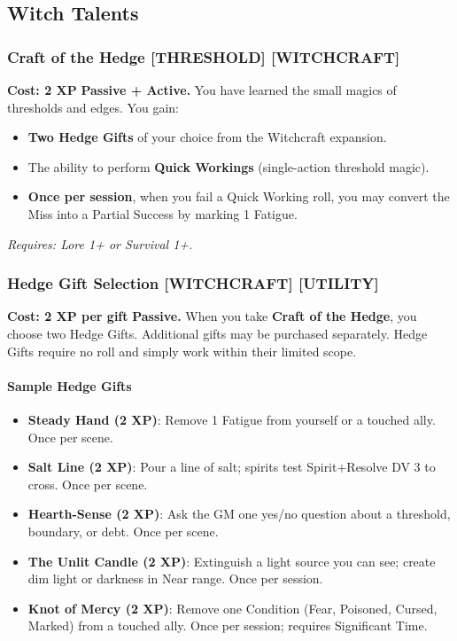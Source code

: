 \documentclass[12pt,a4paper]{book}
\begin{document}
\subsection*{Witch Talents}
\label{sec:minor-witch}

\subsubsection*{Craft of the Hedge \textnormal{[THRESHOLD] [WITCHCRAFT]}}
\label{talent:craft-of-the-hedge}
\textbf{Cost: 2 XP} \textbf{Passive + Active.} You have learned the small magics of thresholds and edges. You gain:
\begin{itemize}
\item \textbf{Two Hedge Gifts} of your choice from the Witchcraft expansion.
\item The ability to perform \textbf{Quick Workings} (single-action threshold magic).
\item \textbf{Once per session}, when you fail a Quick Working roll, you may convert the Miss into a Partial Success by marking 1 Fatigue.
\end{itemize}
\textit{Requires: Lore 1+ or Survival 1+.}

\subsubsection*{Hedge Gift Selection \textnormal{[WITCHCRAFT] [UTILITY]}}
\label{talent:hedge-gift-selection}
\textbf{Cost: 2 XP per gift} \textbf{Passive.} When you take \textbf{Craft of the Hedge}, you choose two Hedge Gifts. Additional gifts may be purchased separately. Hedge Gifts require no roll and simply work within their limited scope.

\paragraph*{Sample Hedge Gifts}
\begin{itemize}
\item \textbf{Steady Hand (2 XP)}: Remove 1 Fatigue from yourself or a touched ally. Once per scene.
\item \textbf{Salt Line (2 XP)}: Pour a line of salt; spirits test Spirit+Resolve DV 3 to cross. Once per scene.
\item \textbf{Hearth-Sense (2 XP)}: Ask the GM one yes/no question about a threshold, boundary, or debt. Once per scene.
\item \textbf{The Unlit Candle (2 XP)}: Extinguish a light source you can see; create dim light or darkness in Near range. Once per session.
\item \textbf{Knot of Mercy (2 XP)}: Remove one Condition (Fear, Poisoned, Cursed, Marked) from a touched ally. Once per session; requires Significant Time.
\end{itemize}
\end{document}
